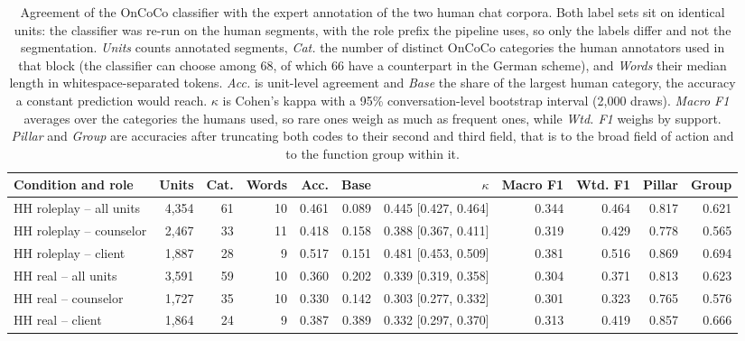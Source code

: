 \begin{table}[t]
\centering
\small
\begin{tabular}{lrrrrrrrrrr}
\hline
Condition and role & Units & Cat. & Words & Acc. & Base & $\kappa$ & Macro F1 & Wtd. F1 & Pillar & Group \\
\hline
HH roleplay -- all units & 4,354 & 61 & 10 & 0.461 & 0.089 & 0.445 \footnotesize[0.427, 0.464] & 0.344 & 0.464 & 0.817 & 0.621 \\
HH roleplay -- counselor & 2,467 & 33 & 11 & 0.418 & 0.158 & 0.388 \footnotesize[0.367, 0.411] & 0.319 & 0.429 & 0.778 & 0.565 \\
HH roleplay -- client & 1,887 & 28 & 9 & 0.517 & 0.151 & 0.481 \footnotesize[0.453, 0.509] & 0.381 & 0.516 & 0.869 & 0.694 \\
HH real -- all units & 3,591 & 59 & 10 & 0.360 & 0.202 & 0.339 \footnotesize[0.319, 0.358] & 0.304 & 0.371 & 0.813 & 0.623 \\
HH real -- counselor & 1,727 & 35 & 10 & 0.330 & 0.142 & 0.303 \footnotesize[0.277, 0.332] & 0.301 & 0.323 & 0.765 & 0.576 \\
HH real -- client & 1,864 & 24 & 9 & 0.387 & 0.389 & 0.332 \footnotesize[0.297, 0.370] & 0.313 & 0.419 & 0.857 & 0.666 \\
\hline
\end{tabular}
\caption{Agreement of the OnCoCo classifier with the expert annotation of the two human chat corpora. Both label sets sit on identical units: the classifier was re-run on the human segments, with the role prefix the pipeline uses, so only the labels differ and not the segmentation. \emph{Units} counts annotated segments, \emph{Cat.} the number of distinct OnCoCo categories the human annotators used in that block (the classifier can choose among 68, of which 66 have a counterpart in the German scheme), and \emph{Words} their median length in whitespace-separated tokens. \emph{Acc.} is unit-level agreement and \emph{Base} the share of the largest human category, the accuracy a constant prediction would reach. $\kappa$ is Cohen's kappa with a 95\% conversation-level bootstrap interval (2{,}000 draws). \emph{Macro F1} averages over the categories the humans used, so rare ones weigh as much as frequent ones, while \emph{Wtd. F1} weighs by support. \emph{Pillar} and \emph{Group} are accuracies after truncating both codes to their second and third field, that is to the broad field of action and to the function group within it.}
\label{Stab:human-validation}
\end{table}